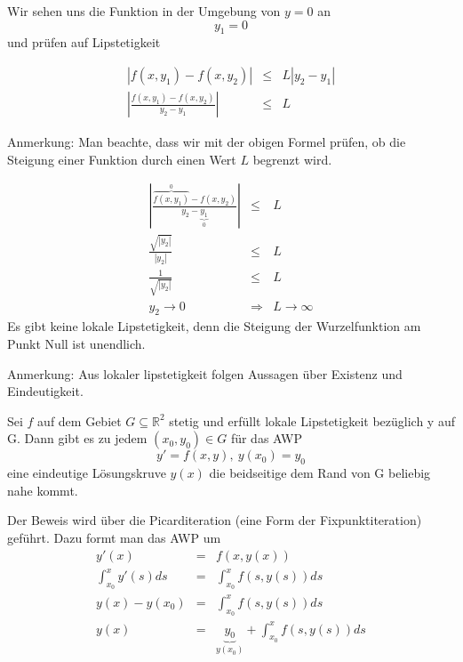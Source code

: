 \documentclass[10pt,a4paper]{article}
\begin{document}
\begin{bsp}[$f(x,y)= \sqrt{\left| y\right|}$]

Wir sehen uns die Funktion in der Umgebung von $y=0$ an
\begin{equation*}
y_1=0
\end{equation*}
und prüfen auf Lipstetigkeit

\begin{eqnarray*}
|f(x,y_1)-f(x,y_2)| & \leq & L | y_2-y_1 | \\
\left| \frac{f(x,y_1)-f(x,y_2)}{ y_2-y_1 } \right| & \leq & L
\end{eqnarray*}

Anmerkung: Man beachte, dass wir mit der obigen Formel prüfen, ob die Steigung einer Funktion durch einen Wert $L$ begrenzt wird.

\begin{eqnarray*}
\left| \frac{\overbrace{f(x,y_1)}^{0}-f(x,y_2)}{ y_2-\underbrace{y_1}_0 } \right| & \leq & L \\
\frac{\sqrt{\left| y_2\right|}}{ | y_2|} & \leq & L\\
\frac{1}{\sqrt{\left| y_2\right|}} &\leq & L\\
y_2 \rightarrow 0 &\Rightarrow & L \rightarrow \infty
\end{eqnarray*}
Es gibt keine lokale Lipstetigkeit, denn die Steigung der Wurzelfunktion am Punkt Null ist unendlich.
\end{bsp}

Anmerkung:
Aus lokaler lipstetigkeit folgen Aussagen über Existenz und Eindeutigkeit.

\begin{satz}
Sei $f$ auf dem Gebiet $G \subseteq \mathbb{R}^{2}$ stetig und erfüllt lokale Lipstetigkeit bezüglich y auf G. Dann gibt es zu jedem $(x_0,y_0) \in G$ für das AWP 
\begin{equation*}
y'=f(x,y),~ y(x_0)=y_0
\end{equation*}
eine eindeutige Lösungskruve $y(x)$ die beidseitige dem Rand von G beliebig nahe kommt.
\end{satz}

Der Beweis wird über die Picarditeration (eine Form der Fixpunktiteration) geführt. Dazu formt man das AWP um 
\begin{eqnarray*}
y'(x)&=&f(x,y(x)) \\
\int^{x}_{x_0} y'(s) ds &=& \int^{x}_{x_0} f(s,y(s)) ds \\
y(x)-y(x_0) &=& \int^{x}_{x_0} f(s,y(s)) ds \\
y(x) &=&\underbrace{y_0}_{y(x_0)} +  \int^{x}_{x_0} f(s,y(s)) ds
\end{eqnarray*}
\end{document}
